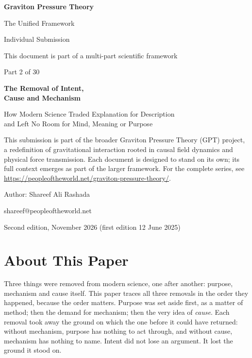 \documentclass[11pt,a4paper]{article}
\begin{document}
\begin{titlepage}
\centering
\vspace*{1.5cm}
{\Huge\bfseries Graviton Pressure Theory\par}
\vspace{0.4cm}
{\Large The Unified Framework\par}
{\large Individual Submission\par}
\vspace{0.3cm}
{\normalsize This document is part of a multi-part scientific framework\par}
\vspace{1.6cm}
{\large Part 2 of 30\par}
\vspace{0.6cm}
{\huge\bfseries The Removal of Intent,\\[4pt] Cause and Mechanism\par}
\vspace{0.5cm}
{\Large How Modern Science Traded Explanation for Description\\[2pt] and Left No Room for Mind, Meaning or Purpose\par}
\vspace{1.4cm}
\begin{minipage}{0.82\textwidth}\centering\small
This submission is part of the broader Graviton Pressure Theory (GPT) project, a redefinition of gravitational interaction rooted in causal field dynamics and physical force transmission. Each document is designed to stand on its own; its full context emerges as part of the larger framework. For the complete series, see \url{https://peopleoftheworld.net/graviton-pressure-theory/}.
\end{minipage}
\vfill
{\large Author: Shareef Ali Rashada\par}
{\normalsize shareef@peopleoftheworld.net\par}
\vspace{0.3cm}
{\normalsize Second edition, November 2026 \quad (first edition 12 June 2025)\par}
\end{titlepage}

\tableofcontents
\newpage

\section*{About This Paper}

Three things were removed from modern science, one after another: purpose, mechanism and cause itself. This paper traces all three removals in the order they happened, because the order matters. Purpose was set aside first, as a matter of method; then the demand for mechanism; then the very idea of \emph{cause}. Each removal took away the ground on which the one before it could have returned: without mechanism, purpose has nothing to act through, and without cause, mechanism has nothing to name. Intent did not lose an argument. It lost the ground it stood on.
\end{document}
